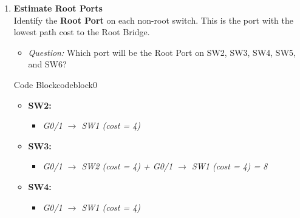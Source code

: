 \documentclass[a4paper]{book}
\begin{document}
\begin{enumerate}
\begin{ocg}{Code Block}{codeblock}{0}
\begin{tcolorbox}
{				      MAC SW1 < MAC SW2 < MAC SW3 < MAC SW4

				      Therefore, SW1 will be the Root Bridge.
			      }
		      \end{tcolorbox}
	      \end{ocg}



	\item \textbf{Estimate Root Ports} \\
	      Identify the \textbf{Root Port} on each non-root switch. This is the port with the lowest path cost to the Root Bridge.
	      \begin{itemize}
		      \item \textit{Question:} Which port will be the Root Port on SW2, SW3, SW4, SW5, and SW6?
	      \end{itemize}



	      \begin{ocg}{Code Block}{codeblock}{0}
		      \vspace{0.5cm}
		      \begin{tcolorbox}
			      \small{
				      \begin{itemize}
					      \item \textbf{SW2:}
					            \begin{itemize}
						            \item \textit{G0/1 $\rightarrow$ SW1 (cost = 4)}
					            \end{itemize}

					      \item \textbf{SW3:}
					            \begin{itemize}
						            \item \textit{G0/1 $\rightarrow$ SW2 (cost = 4) + G0/1 $\rightarrow$ SW1 (cost = 4) = 8}
					            \end{itemize}

					      \item \textbf{SW4:}
					            \begin{itemize}
						            \item \textit{G0/1 $\rightarrow$ SW1 (cost = 4)}
					            \end{itemize}


\end{itemize}}
\end{tcolorbox}
\end{ocg}
\end{enumerate}
\end{document}

